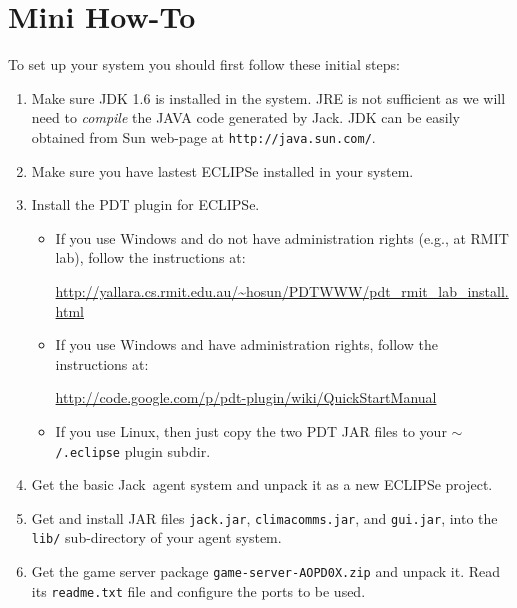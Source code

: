 \documentclass[10pt]{article}
\newcommand{\propername}[1]{\mbox{\sf #1}\xspace}
\newcommand{\JACK}{\propername{Jack}}
\newcommand{\PDT}{\propername{PDT}}
\newcommand{\ECLIPSE}{\propername{ECLIPSe}}
\begin{document}
\section{Mini How-To}
% 
To set up your system you should first follow these initial steps:
%
\begin{enumerate}\addtolength{\itemsep}{-.02in}
  
 \item Make sure JDK 1.6 is installed in the system. JRE is not sufficient as we will need to \textit{compile} the JAVA code generated by \JACK. JDK can be easily obtained from Sun web-page at \texttt{http://java.sun.com/}. 

\item Make sure you have lastest \ECLIPSE installed in your system.
 
\item Install the \PDT plugin for \ECLIPSE.
\begin{itemize}
  \item If you use Windows and do not have administration rights (e.g., at RMIT lab), follow the instructions at:
  	\begin{center}
  		\url{http://yallara.cs.rmit.edu.au/~hosun/PDTWWW/pdt_rmit_lab_install.html}
  	\end{center}

  \item If you use Windows and have administration rights, follow the instructions at:

  	\begin{center}
		\url{	http://code.google.com/p/pdt-plugin/wiki/QuickStartManual}
  	\end{center}
		
  	
  	\item If you use Linux, then just copy the two \PDT JAR files to your \texttt{$\sim$/.eclipse} plugin subdir.
  
\end{itemize}


\item Get the basic \JACK\ agent system and unpack it as a new \ECLIPSE project.

\item Get and install JAR files \texttt{jack.jar}, \texttt{climacomms.jar}, and \texttt{gui.jar}, into the \texttt{lib/} sub-directory of your agent system.

\item Get the game server package \texttt{game-server-AOPD0X.zip} and unpack it. Read its \texttt{readme.txt} file and configure the ports to be used.

\end{enumerate}
\end{document}
